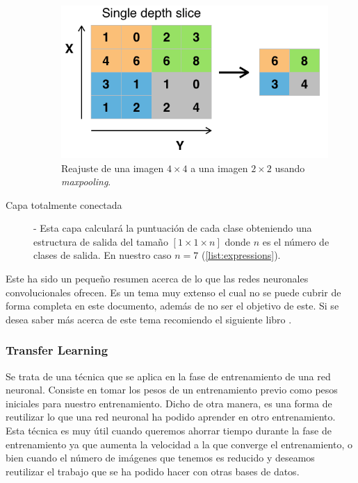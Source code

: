 \documentclass[a4paper,11pt]{book}
\begin{document}
\begin{description}
		\begin{figure}[h]
		\centering
		\includegraphics[width=0.7\linewidth]{imagenes/poolinglayer}
		\caption[PoolingLayer]{Reajuste de una imagen \(4\times4\) a una imagen \(2\times2\) usando \textit{maxpooling}\cite{deshpande16b}.}
		\label{fig:poolinglayer}
		\end{figure}
	\item [Capa totalmente conectada\cite{cs231n}] - Esta capa calculará la puntuación de cada clase obteniendo una estructura de salida del tamaño \([1 \times 1 \times n]\) donde \(n\) es el número de clases de salida. En nuestro caso \(n = 7 \) (\ref{list:expressions}).
\end{description}

Este ha sido un pequeño resumen acerca de lo que las redes neuronales convolucionales ofrecen. Es un tema muy extenso el cual no se puede cubrir de forma completa en este documento, además de no ser el objetivo de este. Si se desea saber más acerca de este tema recomiendo el siguiente libro \cite{nielsen}.
\subsubsection{Transfer Learning \cite{cs231n1}}
Se trata de una técnica que se aplica en la fase de entrenamiento de una red neuronal. Consiste en tomar los pesos de un entrenamiento previo como pesos iniciales para nuestro entrenamiento. Dicho de otra manera, es una forma de reutilizar lo que una red neuronal ha podido aprender en otro entrenamiento.\\
Esta técnica es muy útil cuando queremos ahorrar tiempo durante la fase de entrenamiento ya que aumenta la velocidad a la que converge el entrenamiento, o bien cuando el número de imágenes que tenemos es reducido y deseamos reutilizar el trabajo que se ha podido hacer con otras bases de datos.
\end{document}
